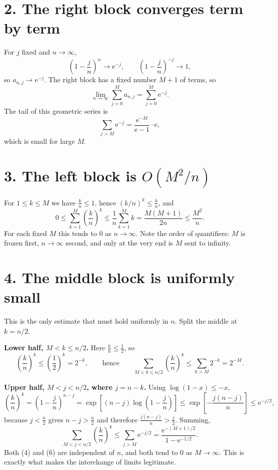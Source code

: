 \documentclass[12pt]{article}
\newcommand{\e}{\mathrm{e}}
\begin{document}
\section*{2. The right block converges term by term}

For \(j\) fixed and \(n\to\infty\),
\[
\left(1-\frac jn\right)^{n}\longrightarrow\e^{-j},
\qquad
\left(1-\frac jn\right)^{-j}\longrightarrow1,
\]
so \(a_{n,j}\to\e^{-j}\). The right block has a fixed number \(M+1\) of
terms, so
\[
\lim_{n\to\infty}\sum_{j=0}^{M}a_{n,j}=\sum_{j=0}^{M}\e^{-j}.
\tag{2}
\]
The tail of this geometric series is
\[
\sum_{j>M}\e^{-j}=\frac{\e^{-M}}{\e-1}\cdot\e ,
\]
which is small for large \(M\).

\section*{3. The left block is \(O(M^2/n)\)}

For \(1\le k\le M\) we have \(\frac kn\le1\), hence
\((k/n)^k\le\frac kn\), and
\[
0\le\sum_{k=1}^{M}\left(\frac kn\right)^k
\le\frac1n\sum_{k=1}^{M}k
=\frac{M(M+1)}{2n}\le\frac{M^2}{n}.
\tag{3}
\]
For each fixed \(M\) this tends to \(0\) as \(n\to\infty\). Note the order
of quantifiers: \(M\) is frozen first, \(n\to\infty\) second, and only at
the very end is \(M\) sent to infinity.

\section*{4. The middle block is uniformly small}

This is the only estimate that must hold uniformly in \(n\). Split the
middle at \(k=n/2\).

\textbf{Lower half, \(M<k\le n/2\).} Here \(\frac kn\le\frac12\), so
\[
\left(\frac kn\right)^k\le\left(\frac12\right)^k=2^{-k},
\qquad\text{hence}\qquad
\sum_{M<k\le n/2}\left(\frac kn\right)^k\le\sum_{k>M}2^{-k}=2^{-M}.
\tag{4}
\]

\textbf{Upper half, \(M<j<n/2\), where \(j=n-k\).} Using
\(\log(1-x)\le-x\),
\[
\left(\frac kn\right)^k
=\left(1-\frac jn\right)^{n-j}
=\exp\!\left[(n-j)\log\left(1-\frac jn\right)\right]
\le\exp\!\left[-\frac{j(n-j)}{n}\right]
\le\e^{-j/2},
\tag{5}
\]
because \(j<\frac n2\) gives \(n-j>\frac n2\) and therefore
\(\frac{j(n-j)}{n}>\frac j2\). Summing,
\[
\sum_{M<j<n/2}\left(\frac kn\right)^k\le\sum_{j>M}\e^{-j/2}
=\frac{\e^{-(M+1)/2}}{1-\e^{-1/2}} .
\tag{6}
\]
Both (4) and (6) are independent of \(n\), and both tend to \(0\) as
\(M\to\infty\). This is exactly what makes the interchange of limits
legitimate.
\end{document}
